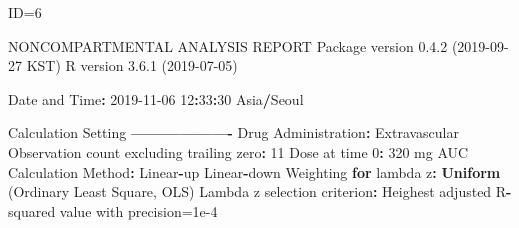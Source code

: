 \documentclass[12pt,]{krantz}
\newenvironment{Shaded}{\begin{snugshade}}{\end{snugshade}}
\newcommand{\ControlFlowTok}[1]{\textcolor[rgb]{0.13,0.29,0.53}{\textbf{#1}}}
\newcommand{\DecValTok}[1]{\textcolor[rgb]{0.00,0.00,0.81}{#1}}
\newcommand{\FloatTok}[1]{\textcolor[rgb]{0.00,0.00,0.81}{#1}}
\newcommand{\KeywordTok}[1]{\textcolor[rgb]{0.13,0.29,0.53}{\textbf{#1}}}
\newcommand{\NormalTok}[1]{#1}
\newcommand{\OperatorTok}[1]{\textcolor[rgb]{0.81,0.36,0.00}{\textbf{#1}}}
\newcommand{\StringTok}[1]{\textcolor[rgb]{0.31,0.60,0.02}{#1}}
\begin{document}
\begin{Shaded}
\begin{Highlighting}[]
\NormalTok{ID=}\DecValTok{6}

\NormalTok{                        NONCOMPARTMENTAL ANALYSIS REPORT}
\NormalTok{                       Package version }\DecValTok{0}\NormalTok{.}\FloatTok{4.2}\NormalTok{ (}\DecValTok{2019-09-27}\NormalTok{ KST)}
\NormalTok{                          R version }\DecValTok{3}\NormalTok{.}\FloatTok{6.1}\NormalTok{ (}\DecValTok{2019-07-05}\NormalTok{)}

\NormalTok{Date and Time}\OperatorTok{:}\StringTok{ }\DecValTok{2019-11-06} \DecValTok{12}\OperatorTok{:}\DecValTok{33}\OperatorTok{:}\DecValTok{30}\NormalTok{ Asia}\OperatorTok{/}\NormalTok{Seoul}

\NormalTok{Calculation Setting}
\OperatorTok{-------------------}
\NormalTok{Drug Administration}\OperatorTok{:}\StringTok{ }\NormalTok{Extravascular}
\NormalTok{Observation count excluding trailing zero}\OperatorTok{:}\StringTok{ }\DecValTok{11}
\NormalTok{Dose at time }\DecValTok{0}\OperatorTok{:}\StringTok{ }\DecValTok{320}\NormalTok{ mg}
\NormalTok{AUC Calculation Method}\OperatorTok{:}\StringTok{ }\NormalTok{Linear}\OperatorTok{-}\NormalTok{up Linear}\OperatorTok{-}\NormalTok{down}
\NormalTok{Weighting }\ControlFlowTok{for}\NormalTok{ lambda z}\OperatorTok{:}\StringTok{ }\KeywordTok{Uniform}\NormalTok{ (Ordinary Least Square, OLS)}
\NormalTok{Lambda z selection criterion}\OperatorTok{:}\StringTok{ }\NormalTok{Heighest adjusted R}\OperatorTok{-}\NormalTok{squared value with precision=}\FloatTok{1e-4}



\end{Highlighting}
\end{Shaded}
\end{document}
